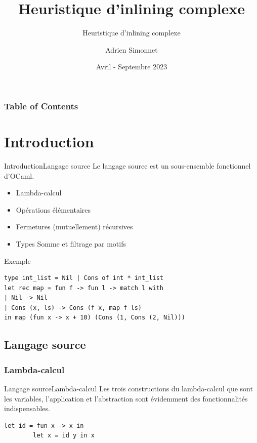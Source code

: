 \documentclass{beamer}
\title[Rapport de stage STL]{Heuristique d'inlining complexe}
\subtitle{Heuristique d'inlining complexe}
\author{Adrien Simonnet}
\institute{Sorbonne Université}
\date{Avril - Septembre 2023}
\begin{document}
\frame{\titlepage}

\begin{frame}
    \frametitle{Table of Contents}
    \tableofcontents
\end{frame}

\section{Introduction}

\begin{frame}[fragile]{Introduction}{Langage source}
    Le langage source est un sous-ensemble fonctionnel d'OCaml.

    \begin{itemize}
        \item Lambda-calcul
        \item Opérations élémentaires
        \item Fermetures (mutuellement) récursives
        \item Types Somme et filtrage par motifs
    \end{itemize}

    \begin{exampleblock}{Exemple}
        \begin{lstlisting}[language=caml]
type int_list = Nil | Cons of int * int_list
let rec map = fun f -> fun l -> match l with
| Nil -> Nil
| Cons (x, ls) -> Cons (f x, map f ls)
in map (fun x -> x + 10) (Cons (1, Cons (2, Nil)))
        \end{lstlisting}
    \end{exampleblock}
\end{frame}


\iffalse
\subsection{Langage source}

\subsubsection{Lambda-calcul}

\begin{frame}[fragile]{Langage source}{Lambda-calcul}
    Les trois constructions du lambda-calcul que sont les variables, l'application et l'abstraction sont évidemment des fonctionnalités indispensables.
    \begin{lstlisting}[language=caml]
        let id = fun x -> x in
        let x = id y in x
    \end{lstlisting}
\end{frame}
\end{document}
